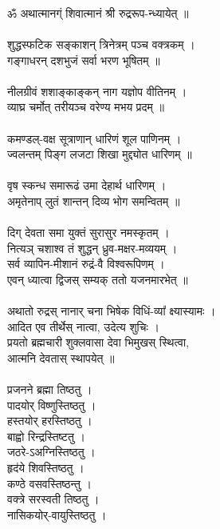 \section{}
\\
ॐ अथात्मानग्ं शिवात्मानं श्री रुद्ररूप-न्ध्यायेत् ॥\\
\\
शुद्धस्फटिक सङ्काशन् त्रिनेत्रम् पञ्च वक्त्रकम् ।\\
गङ्गाधरन् दशभुजं सर्वा भरण भूषितम् ॥\\
\\
नीलग्रीवं शशाङ्काङ्कन् नाग यज्ञोप वीतिनम् ।\\
व्याघ्र चर्मोत् तरीयञ्च वरेण्य मभय प्रदम् ॥\\
\\
कमण्डल्-वक्ष सूत्राणान् धारिणं शूल पाणिनम् ।\\
ज्वलन्तम् पिङ्ग लजटा शिखा मुद्द्योत धारिणम् ॥\\
\\
वृष स्कन्ध समारूढं उमा देहार्थ धारिणम् ।\\
अमृतेनाप् लुतं शान्तन् दिव्य भोग समन्वितम् ॥\\
\\
दिग् देवता समा युक्तं सुरासुर नमस्कृतम् ।\\
नित्यञ् चशाश्व तं शुद्धन् ध्रुव-मक्षर-मव्ययम् ।\\
सर्व व्यापिन-मीशानं रुद्रं-वै विश्वरूपिणम् ।\\
एवन् ध्यात्वा द्विजस् सम्यक् ततो यजनमारभेत् ॥\\
\\
अथातो रुद्रस् नानार् चना भिषेक विधिं-व्या᳚ क्ष्यास्यामः ।\\
आदित एव तीर्थेस् नात्वा, उदेत्य शुचिः ।\\
प्रयतो ब्रह्मचारी शुक्लवासा देवा भिमुखस् स्थित्वा,\\
आत्मनि देवतास् स्थापयेत् ॥\\
\\
प्रजनने ब्रह्मा तिष्ठतु ।\\
पादयोर् विष्णुस्तिष्ठतु ।\\
हस्तयोर्​ हरस्तिष्ठतु ।\\
बाह्वो रिन्द्रस्तिष्टतु ।\\
जठरे-ऽअग्निस्तिष्ठतु ।\\
हृद॑ये शिवस्तिष्ठतु ।\\
कण्ठे वसवस्तिष्ठन्तु ।\\
वक्त्रे सरस्वती तिष्ठतु ।\\
नासिकयोर्-वायुस्तिष्ठतु ।\\
